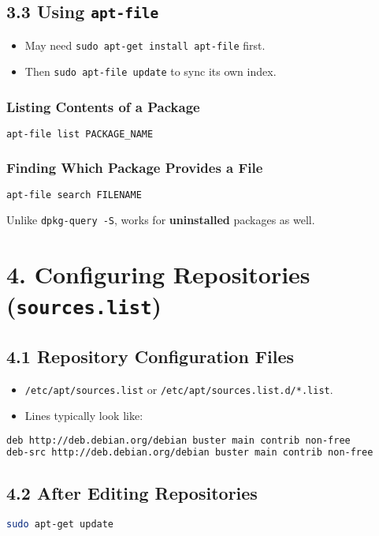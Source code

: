 \documentclass[12pt,a4paper]{report}
\begin{document}
\subsection*{3.3 Using \texttt{apt-file}}
\begin{itemize}
    \item May need \texttt{sudo apt-get install apt-file} first.  
    \item Then \texttt{sudo apt-file update} to sync its own index.
\end{itemize}

\subsubsection*{Listing Contents of a Package}
\begin{lstlisting}[language=bash]
apt-file list PACKAGE_NAME
\end{lstlisting}

\subsubsection*{Finding Which Package Provides a File}
\begin{lstlisting}[language=bash]
apt-file search FILENAME
\end{lstlisting}
Unlike \texttt{dpkg-query -S}, works for \textbf{uninstalled} packages as well.

 

\section*{4. Configuring Repositories (\texttt{sources.list})}

\subsection*{4.1 Repository Configuration Files}
\begin{itemize}
    \item \texttt{/etc/apt/sources.list} or \texttt{/etc/apt/sources.list.d/*.list}.  
    \item Lines typically look like:
\end{itemize}
 \begin{lstlisting}[language=bash]
deb http://deb.debian.org/debian buster main contrib non-free
deb-src http://deb.debian.org/debian buster main contrib non-free
\end{lstlisting}

\subsection*{4.2 After Editing Repositories}
 \begin{lstlisting}[language=bash]
sudo apt-get update
\end{lstlisting}
\end{document}
